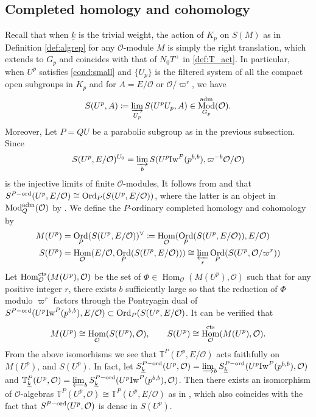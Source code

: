 \documentclass[leqno]{amsart}
\newcommand{\wt}[1]{\underline{ #1 }}
\newcommand{\TT}{\mathbb{T}} %
\newcommand{\Iw}{\textnormal{Iw}}
\newcommand{\aMod}{\textnormal{Mod}^{\textnormal{adm}}}
\DeclareMathOperator{\Mod}{\textnormal{Mod}}
\DeclareMathOperator{\Ord}{Ord}
\newcommand{\cts}{\textnormal{cts}}
\newcommand{\adm}{\textnormal{adm}}
\newcommand{\ord}{\textnormal{ord}}
\newcommand{\oo}{\mathcal{O}} %
\DeclareMathOperator{\Hom}{Hom}
\theoremstyle{definition}
\theoremstyle{remark}
\begin{document}
\subsection{Completed homology and cohomology}

Recall that when $\wt{k}$ is the trivial weight,
the action of $K_p$
on  $S(M)$ as in Definition \ref{def:algrep} 
for any  $\oo$-module $M$
is simply the right translation,
which extends to $G_p$
and coincides with that of $N_0T^+$ in \eqref{def:T_act}.
In particular,
when $U^p$ satisfies \eqref{cond:small}
and $\{U_p\}$ is the filtered system of 
all the compact open subgroups in $K_p$
and for $A=E/\oo$ or  $\oo/\varpi^{r}$, we have
\begin{equation}\label{eq:complete}
	S(U^p,A)\coloneqq
	\varinjlim_{U_p}S(U^pU_p,A)\in 
	\Mod^{\adm}_{G_p}(\oo).
\end{equation}
Moreover, Let $P=QU$ be a parabolic subgroup 
as in the previous subsection.
Since 
\[
	S(U^p,E/\oo)^{U_0}=
	\varinjlim_{b}
	S(U^p\Iw^P(p^{b,b}),\varpi^{-b}\oo/\oo)
\]
is the injective limits of finite $\oo$-modules,
It follows from \cite[Lem 3.1.5]{emeI} and \cite[Prop 3.2.4]{emeI}
that $S^{P-\ord}(U^p,E/\oo)\cong \Ord_P(S(U^p,E/\oo))$,
where the latter is an object in $\aMod_Q(\oo)$
by \cite[Thm 3.3.3]{emeI}.
We define the $P$-ordinary completed homology and cohomology by
\begin{align}
	M(U^p)&=
	\Ord_P(S(U^p,E/\oo))^\vee
	\coloneqq \Hom_\oo(\Ord_P(S(U^p,E/\oo)),E/\oo)\\
	S(U^p)&=\Hom_\oo(E/\oo, \Ord_P(S(U^p,E/\oo)))
	\cong \varprojlim_r \Ord_P(S(U^p,\oo/\varpi^{r}))
\end{align}
Let $\Hom_\oo^{\cts}(M(U^p),\oo)$
be the set of
$\Phi\in \Hom_\oo(M(U^p),\oo)$ 
such that for any positive integer $r$,
there exists $b$ sufficiently large so that 
the reduction of $\Phi$ modulo $\varpi^r$
factors through
the Pontryagin dual of 
$S^{P-\ord}(U^p\Iw^P(p^{b,b}),E/\oo)\subset \Ord_P(S(U^p,E/\oo)$. 
It can be verified that 
\[
	M(U^p)\cong \Hom_\oo(S(U^p),\oo),\qquad
	S(U^p)\cong \Hom_\oo^{\cts}(M(U^p),\oo).
\]
From the above isomorhisms we see that
$\TT^P(U^p,E/\oo)$ acts faithfully
on  $M(U^p)$, and  $S(U^p)$.
In fact, 
let $S_{\wt{k}}^{P-\ord}(U^p,\oo)
=\varinjlim_{b}S_{\wt{k}}^{P-\ord}(U^p\Iw^P(p^{b,b}),\oo)$
and 
$\TT^P_{\wt{k}}(U^p,\oo)=\varprojlim_bS_{\wt{k}}^{P-\ord}(U^p\Iw^P(p^{b,b}),\oo)$.
Then there exists an isomorphism of $\oo$-algebras 
$\TT^P(U^p,\oo)\cong \TT^P(U^p,E/\oo)$
as in \cite[Lem 2.17]{ger},
which also coincides with the fact that
$S^{P-\ord}(U^p,\oo)$ is dense in $S(U^p)$.
\end{document}
